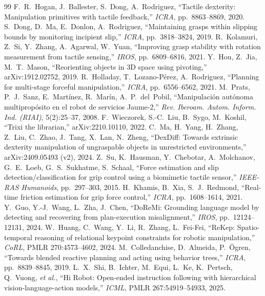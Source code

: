 \documentclass[10pt,twocolumn]{article}
\begin{document}
{\begin{thebibliography}{99}
 F.~R.~Hogan, J.~Ballester, S.~Dong, A.~Rodriguez, ``Tactile dexterity: Manipulation primitives with tactile feedback,'' \emph{ICRA}, pp.~8863--8869, 2020.
 S.~Dong, D.~Ma, E.~Donlon, A.~Rodriguez, ``Maintaining grasps within slipping bounds by monitoring incipient slip,'' \emph{ICRA}, pp.~3818--3824, 2019.
 R.~Kolamuri, Z.~Si, Y.~Zhang, A.~Agarwal, W.~Yuan, ``Improving grasp stability with rotation measurement from tactile sensing,'' \emph{IROS}, pp.~6809--6816, 2021.
 Y.~Hou, Z.~Jia, M.~T.~Mason, ``Reorienting objects in 3D space using pivoting,'' arXiv:1912.02752, 2019.
 R.~Holladay, T.~Lozano-P\'erez, A.~Rodriguez, ``Planning for multi-stage forceful manipulation,'' \emph{ICRA}, pp.~6556--6562, 2021.
 M.~Prats, P.~J.~Sanz, E.~Mart\'inez, R.~Mar\'in, A.~P.~del~Pobil, ``Manipulaci\'on aut\'onoma multiprop\'osito en el robot de servicios Jaume-2,'' \emph{Rev. Iberoam. Autom. Inform. Ind. (RIAI)}, 5(2):25--37, 2008.
 F.~Wieczorek, S.-C.~Liu, B.~Sygo, M.~Koshil, ``Trixi the librarian,'' arXiv:2210.10110, 2022.
 C.~Ma, H.~Yang, H.~Zhang, Z.~Liu, C.~Zhao, J.~Tang, X.~Lan, N.~Zheng, ``DexDiff: Towards extrinsic dexterity manipulation of ungraspable objects in unrestricted environments,'' arXiv:2409.05493 (v2), 2024.
 Z.~Su, K.~Hausman, Y.~Chebotar, A.~Molchanov, G.~E.~Loeb, G.~S.~Sukhatme, S.~Schaal, ``Force estimation and slip detection/classification for grip control using a biomimetic tactile sensor,'' \emph{IEEE-RAS Humanoids}, pp.~297--303, 2015.
 H.~Khamis, B.~Xia, S.~J.~Redmond, ``Real-time friction estimation for grip force control,'' \emph{ICRA}, pp.~1608--1614, 2021.
 Y.~Guo, Y.-J.~Wang, L.~Zha, J.~Chen, ``DoReMi: Grounding language model by detecting and recovering from plan-execution misalignment,'' \emph{IROS}, pp.~12124--12131, 2024.
 W.~Huang, C.~Wang, Y.~Li, R.~Zhang, L.~Fei-Fei, ``ReKep: Spatio-temporal reasoning of relational keypoint constraints for robotic manipulation,'' \emph{CoRL}, PMLR 270:4573--4602, 2024.
 M.~Colledanchise, D.~Almeida, P.~\"Ogren, ``Towards blended reactive planning and acting using behavior trees,'' \emph{ICRA}, pp.~8839--8845, 2019.
 L.~X.~Shi, B.~Ichter, M.~Equi, L.~Ke, K.~Pertsch, Q.~Vuong, \emph{et al.}, ``Hi Robot: Open-ended instruction following with hierarchical vision-language-action models,'' \emph{ICML}, PMLR 267:54919--54933, 2025.

\end{thebibliography}}
\end{document}
